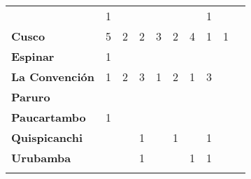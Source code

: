 \begin{tabular}{lccccccccc}
	&1
	&\cellcolor[HTML]{FCC46C}					
	&\cellcolor[HTML]{FCC46C}
	&\cellcolor[HTML]{FCC46C}					
	&\cellcolor[HTML]{FCC46C}
	&\cellcolor[HTML]{FCC46C}					
	&1
	&\cellcolor[HTML]{FCC46C}\\
	\textbf{Cusco}                            										
	&5											
	&2											
	&2		
	&3											
	&2
	&4											
	&1
	&1\\								
	\textbf{Espinar}       					             							
	&1
	&\cellcolor[HTML]{FCC46C}					
	&\cellcolor[HTML]{FCC46C}
	&\cellcolor[HTML]{FCC46C}					
	&\cellcolor[HTML]{FCC46C}
	&\cellcolor[HTML]{FCC46C}					
	&\cellcolor[HTML]{FCC46C}
	&\cellcolor[HTML]{FCC46C}\\	
	\textbf{La Convención}                      					
	&1											
	&2											&3											
	&1											&2											
	&1											
	&3
	&\cellcolor[HTML]{FCC46C}\\	
	\textbf{Paruro}                            					
	&\cellcolor[HTML]{FCC46C}					&\cellcolor[HTML]{FCC46C}					
	&\cellcolor[HTML]{FCC46C}					&\cellcolor[HTML]{FCC46C}					
	&\cellcolor[HTML]{FCC46C}					
	&\cellcolor[HTML]{FCC46C}
	&\cellcolor[HTML]{FCC46C} 					
	&\cellcolor[HTML]{FCC46C}\\
	\textbf{Paucartambo}               		                       					
	&1
	&\cellcolor[HTML]{FCC46C}					
	&\cellcolor[HTML]{FCC46C}
	&\cellcolor[HTML]{FCC46C}					
	&\cellcolor[HTML]{FCC46C}
	&\cellcolor[HTML]{FCC46C}					
	&\cellcolor[HTML]{FCC46C}
	&\cellcolor[HTML]{FCC46C}\\
	\textbf{Quispicanchi}                                         	      			&\cellcolor[HTML]{FCC46C}					
	&\cellcolor[HTML]{FCC46C}					&1											
	&\cellcolor[HTML]{FCC46C}					&1											
	&\cellcolor[HTML]{FCC46C}					
	&1
	&\cellcolor[HTML]{FCC46C}\\
	\textbf{Urubamba}                                                      	
	&\cellcolor[HTML]{FCC46C}					
	&\cellcolor[HTML]{FCC46C}					&1											
	&\cellcolor[HTML]{FCC46C}					&\cellcolor[HTML]{FCC46C}					
	&1											
	&1	
	&\cellcolor[HTML]{FCC46C}\\						
	&\multicolumn{1}{l}{}                       &\multicolumn{1}{l}{}            &\multicolumn{1}{l}{}                         
	&\multicolumn{1}{l}{}                       &\multicolumn{1}{l}{}            &\multicolumn{1}{l}{}                       &\multicolumn{1}{l}{}                       &\multicolumn{1}{l}{}            			    
\end{tabular}